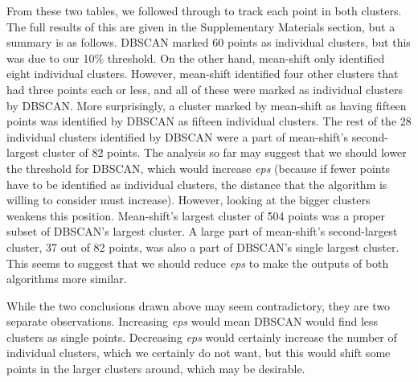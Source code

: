 \documentclass[12pt,a4paper,twocolumn]{article}
\begin{document}
From these two tables, we followed through to track each point in both clusters. The full results of this are given in the Supplementary Materials section, but a summary is as follows. DBSCAN marked 60 points as individual clusters, but this was due to our 10\% threshold. On the other hand, mean-shift only identified eight individual clusters. However, mean-shift identified four other clusters that had three points each or less, and all of these were marked as individual clusters by DBSCAN. More surprisingly, a cluster marked by mean-shift as having fifteen points was identified by DBSCAN as fifteen individual clusters. The rest of the 28 individual clusters identified by DBSCAN were a part of mean-shift's second-largest cluster of 82 points. The analysis so far may suggest that we should lower the threshold for DBSCAN, which would increase \textit{eps} (because if fewer points have to be identified as individual clusters, the distance that the algorithm is willing to consider must increase). However, looking at the bigger clusters weakens this position. Mean-shift's largest cluster of 504 points was a proper subset of DBSCAN's largest cluster. A large part of mean-shift's second-largest cluster, 37 out of 82 points, was also a part of DBSCAN's single largest cluster. This seems to suggest that we should reduce \textit{eps} to make the outputs of both algorithms more similar.

While the two conclusions drawn above may seem contradictory, they are two separate observations. Increasing \textit{eps} would mean DBSCAN would find less clusters as single points. Decreasing \textit{eps} would certainly increase the number of individual clusters, which we certainly do not want, but this would shift some points in the larger clusters around, which may be desirable.



\end{document}
